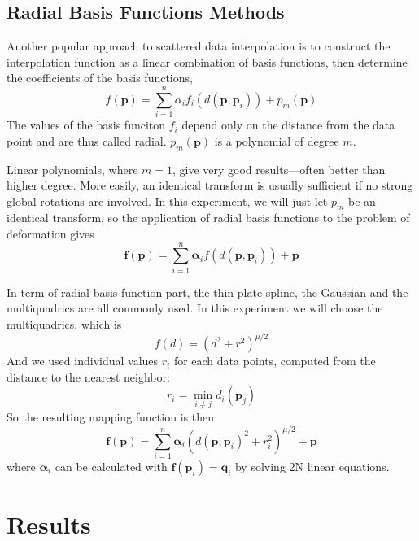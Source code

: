 \documentclass{article}
\begin{document}
\subsection{Radial Basis Functions Methods}
Another popular approach to scattered data interpolation is to construct the interpolation function as a linear combination of basis functions, then determine the coefficients of the basis functions,
\begin{equation}
    f(\mathbf{p})=\sum_{i=1}^n\alpha_if_i(d(\mathbf{p},\mathbf{p}_i))+p_m(\mathbf{p})
\end{equation}
The values of the basis funciton $f_i$ depend only on the distance from the data point and are thus called radial. $p_m(\mathbf{p})$ is a polynomial of degree $m$.

Linear polynomials, where $m=1$, give very good results---often better than higher degree. More easily, an identical transform is usually sufficient if no strong global rotations are involved. In this experiment, we will just let $p_m$ be an identical transform, so the application of radial basis functions to the problem of deformation gives
\begin{equation}
    \mathbf{f}(\mathbf{p})=\sum_{i=1}^n\bm{\alpha}_if(d(\mathbf{p},\mathbf{p}_i))+\mathbf{p}
\end{equation}

In term of radial basis function part, the thin-plate spline, the Gaussian and the multiquadrics are all commonly used. In this experiment we will choose the multiquadrics, which is
\begin{equation}
    f(d)=(d^2+r^2)^{\mu/2}
\end{equation}
And we used individual values $r_i$ for each data points, computed from the distance to the nearest neighbor:
\begin{equation}
    r_i=\min_{i\neq j}d_i(\mathbf{p}_j)
\end{equation}
So the resulting mapping function is then
\begin{equation}
    \mathbf{f}(\mathbf{p})=\sum_{i=1}^n\bm{\alpha}_i(d(\mathbf{p},\mathbf{p}_i)^2+r_i^2)^{\mu/2}+\mathbf{p}
\end{equation}
where $\bm{\alpha}_i$ can be calculated with $\mathbf{f}(\mathbf{p}_i)=\mathbf{q}_i$ by solving 2N linear equations.

\section{Results}
\end{document}
